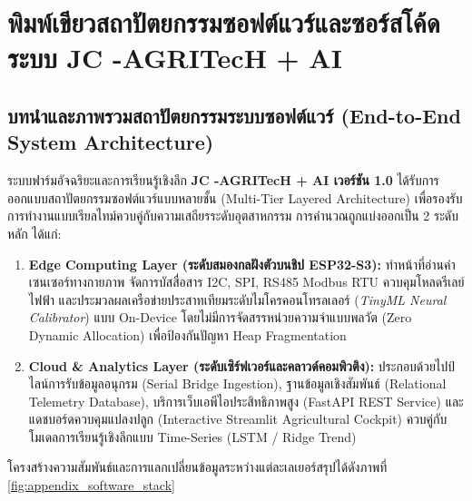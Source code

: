 \chapter{พิมพ์เขียวสถาปัตยกรรมซอฟต์แวร์และซอร์สโค้ดระบบ JC -AGRITecH + AI}
\label{ch:appendix_code}

\section{บทนำและภาพรวมสถาปัตยกรรมระบบซอฟต์แวร์ (End-to-End System Architecture)}

ระบบฟาร์มอัจฉริยะและการเรียนรู้เชิงลึก \textbf{JC -AGRITecH + AI เวอร์ชัน 1.0} ได้รับการออกแบบสถาปัตยกรรมซอฟต์แวร์แบบหลายชั้น (Multi-Tier Layered Architecture) เพื่อรองรับการทำงานแบบเรียลไทม์ควบคู่กับความเสถียรระดับอุตสาหกรรม การคำนวณถูกแบ่งออกเป็น 2 ระดับหลัก ได้แก่:
\begin{enumerate}[leftmargin=20pt, itemsep=2pt]
    \item \textbf{Edge Computing Layer (ระดับสมองกลฝังตัวบนชิป ESP32-S3):} ทำหน้าที่อ่านค่าเซนเซอร์ทางกายภาพ จัดการบัสสื่อสาร I2C, SPI, RS485 Modbus RTU ควบคุมโหลดรีเลย์ไฟฟ้า และประมวลผลเครือข่ายประสาทเทียมระดับไมโครคอนโทรลเลอร์ (\textit{TinyML Neural Calibrator}) แบบ On-Device โดยไม่มีการจัดสรรหน่วยความจำแบบพลวัต (Zero Dynamic Allocation) เพื่อป้องกันปัญหา Heap Fragmentation
    \item \textbf{Cloud \& Analytics Layer (ระดับเซิร์ฟเวอร์และคลาวด์คอมพิวติง):} ประกอบด้วยไปป์ไลน์การรับข้อมูลอนุกรม (Serial Bridge Ingestion), ฐานข้อมูลเชิงสัมพันธ์ (Relational Telemetry Database), บริการเว็บเอพีไอประสิทธิภาพสูง (FastAPI REST Service) และแดชบอร์ดควบคุมแปลงปลูก (Interactive Streamlit Agricultural Cockpit) ควบคู่กับโมเดลการเรียนรู้เชิงลึกแบบ Time-Series (LSTM / Ridge Trend)
\end{enumerate}

โครงสร้างความสัมพันธ์และการแลกเปลี่ยนข้อมูลระหว่างแต่ละเลเยอร์สรุปได้ดังภาพที่ \ref{fig:appendix_software_stack}

